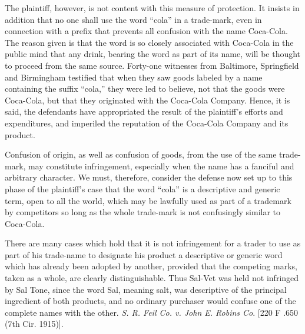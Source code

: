 The plaintiff, however, is not content with this measure of protection. It
insists in addition that no one shall use the word ``cola'' in a trade-mark,
even in connection with a prefix that prevents all confusion with the name
Coca-Cola. The reason given is that the word is so closely associated with
Coca-Cola in the public mind that any drink, bearing the word as part of its
name, will be thought to proceed from the same source. Forty-one witnesses from
Baltimore, Springfield and Birmingham testified that when they saw goods
labeled by a name containing the suffix ``cola,'' they were led to believe, not
that the goods were Coca-Cola, but that they originated with the Coca-Cola
Company. Hence, it is said, the defendants have appropriated the result of the
plaintiff's efforts and expenditures, and imperiled the reputation of the
Coca-Cola Company and its product.

Confusion of origin, as well as confusion of goods, from the use of the same
trade-mark, may constitute infringement, especially when the name has a
fanciful and arbitrary character. We must, therefore, consider the defense now
set up to this phase of the plaintiff's case that the word ``cola'' is a
descriptive and generic term, open to all the world, which may be lawfully used
as part of a trademark by competitors so long as the whole trade-mark is not
confusingly similar to Coca-Cola.

There are many cases which hold that it is not infringement for a trader to use
as part of his trade-name to designate his product a descriptive or generic
word which has already been adopted by another, provided that the competing
marks, taken as a whole, are clearly distinguishable. Thus
{\textquotedbl}Sal-Vet{\textquotedbl} was held not infringed by
{\textquotedbl}Sal Tone{\textquotedbl}, since the word
{\textquotedbl}Sal{\textquotedbl}, meaning salt, was descriptive of the
principal ingredient of both products, and no ordinary purchaser would confuse
one of the complete names with the other. \textit{S. R. Feil Co. v. John E.
Robins Co}. [220 F .650 (7th Cir. 1915)].


